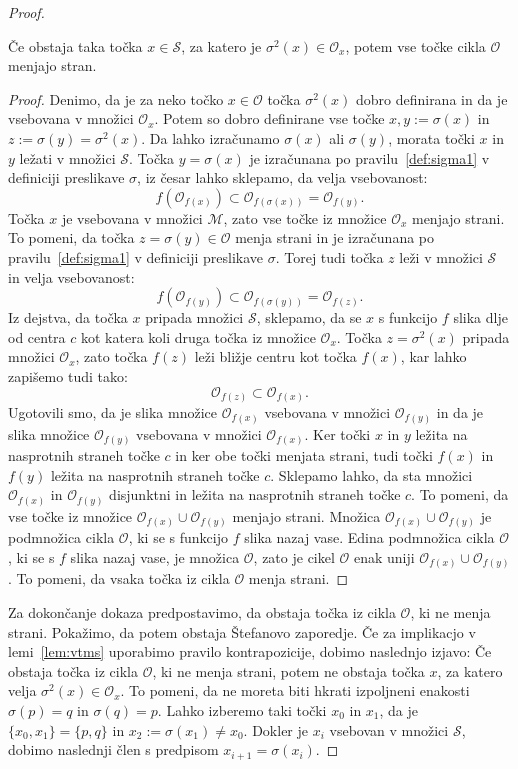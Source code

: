 \documentclass[mat2]{fmfdelo}
\begin{document}
\begin{proof}
\begin{lema}\label{lem:vtms}
Če obstaja taka točka $x \in \mathcal{S}$, za katero je $\sigma^2(x) \in \mathcal{O}_x$, potem vse točke cikla $\mathcal{O}$ menjajo stran.
\end{lema}
\begin{proof}
Denimo, da je za neko točko $x \in \mathcal{O}$ točka $\sigma^2(x)$ dobro definirana in da je vsebovana v množici $\mathcal{O}_x$. Potem so dobro definirane vse točke $x, y:=\sigma(x)$ in $z:=\sigma(y) = \sigma^2(x)$. Da lahko izračunamo $\sigma(x)$ ali $\sigma(y)$, morata točki $x$ in $y$ ležati v množici $\mathcal{S}$. Točka $y=\sigma(x)$ je izračunana po pravilu~\ref{def:sigma1} v definiciji preslikave $\sigma$, iz česar lahko sklepamo, da velja vsebovanost:
$$f(\mathcal{O}_{f(x)}) \subset \mathcal{O}_{f(\sigma(x))}=\mathcal{O}_{f(y)}.$$
Točka $x$ je vsebovana v množici $\mathcal{M}$, zato vse točke iz množice $\mathcal{O}_x$ menjajo strani. To pomeni, da točka $z = \sigma(y) \in \mathcal{O}$ menja strani in je izračunana po pravilu~\ref{def:sigma1} v definiciji preslikave $\sigma$. Torej tudi točka $z$ leži v množici $\mathcal{S}$ in velja vsebovanost:
$$f(\mathcal{O}_{f(y)}) \subset \mathcal{O}_{f(\sigma(y))}=\mathcal{O}_{f(z)}.$$
Iz dejstva, da točka $x$ pripada množici $\mathcal{S}$, sklepamo, da se $x$ s funkcijo $f$ slika dlje od centra $c$ kot katera koli druga točka iz množice $\mathcal{O}_x$. Točka $z=\sigma^2(x)$ pripada množici $\mathcal{O}_x$, zato točka $f(z)$ leži bližje centru kot točka $f(x)$, kar lahko zapišemo tudi tako:
$$\mathcal{O}_{f(z)} \subset \mathcal{O}_{f(x)}.$$
Ugotovili smo, da je slika množice $\mathcal{O}_{f(x)}$ vsebovana v množici $\mathcal{O}_{f(y)}$ in da je slika množice $\mathcal{O}_{f(y)}$ vsebovana v množici $\mathcal{O}_{f(x)}$. Ker točki $x$ in $y$ ležita na nasprotnih straneh točke $c$ in ker obe točki menjata strani, tudi točki $f(x)$ in $f(y)$ ležita na nasprotnih straneh točke $c$. Sklepamo lahko, da sta množici $\mathcal{O}_{f(x)}$ in $\mathcal{O}_{f(y)}$ disjunktni in ležita na nasprotnih straneh točke $c$. To pomeni, da vse točke iz množice $\mathcal{O}_{f(x)} \cup \mathcal{O}_{f(y)}$ menjajo strani. Množica $\mathcal{O}_{f(x)} \cup \mathcal{O}_{f(y)}$ je podmnožica cikla $\mathcal{O}$, ki se s funkcijo $f$ slika nazaj vase. Edina podmnožica cikla $\mathcal{O}$, ki se s $f$ slika nazaj vase, je množica $\mathcal{O}$, zato je cikel $\mathcal{O}$ enak uniji $\mathcal{O}_{f(x)} \cup \mathcal{O}_{f(y)}$. To pomeni, da vsaka točka iz cikla $\mathcal{O}$ menja strani. 
\end{proof}
Za dokončanje dokaza predpostavimo, da obstaja točka iz cikla $\mathcal{O}$, ki ne menja strani. Pokažimo, da potem obstaja Štefanovo zaporedje.
Če za implikacjo v lemi~\ref{lem:vtms} uporabimo pravilo kontrapozicije, dobimo naslednjo izjavo: Če obstaja točka iz cikla $\mathcal{O}$, ki ne menja strani, potem ne obstaja točka $x$, za katero velja $\sigma^2(x) \in \mathcal{O}_x$. To pomeni, da ne moreta biti hkrati izpoljneni enakosti $\sigma(p) = q$ in $\sigma(q) = p$. Lahko izberemo taki točki $x_0$ in $x_1$, da je $\{x_0, x_1\} = \{p, q\}$ in $x_2 := \sigma(x_1) \neq x_0$. Dokler je $x_i$ vsebovan v množici $\mathcal{S}$, dobimo naslednji člen s predpisom $x_{i+1} = \sigma(x_i)$.


\end{proof}
\end{document}
